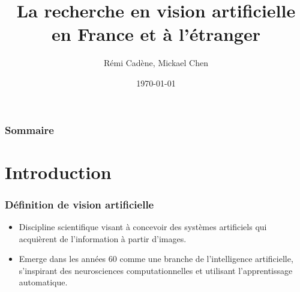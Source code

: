 \documentclass{beamer}
\title[IP exposé]{La recherche en vision artificielle \\ en France et à l'étranger}
\author{Rémi Cadène, Mickael Chen}
\institute[UPMC]
{
Université Pierre et Marie Curie \\ %
\medskip
Exposé de l'UE Insertion Professionnelle %
}
\date{\today} %
\begin{document}
\begin{frame}
\titlepage %
\end{frame}

\begin{frame}
\frametitle{Sommaire} %
\tableofcontents %
\end{frame}







\section{Introduction}

\begin{frame}
\frametitle{Définition de vision artificielle}

	\begin{itemize}
		\item Discipline scientifique visant à concevoir des systèmes artificiels qui acquièrent de l'information à partir d'images.
		\item Emerge dans les années 60 comme une branche de l'intelligence artificielle, s'inspirant des neurosciences computationnelles et utilisant l'apprentissage automatique.
\end{itemize}

\end{frame}
\end{document}
